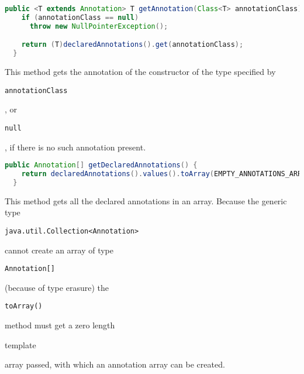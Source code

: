 \documentclass[a4paper, 10pt, titlepage]{scrartcl} %
\begin{document}
\begin{lstlisting}[language=Java,firstnumber=425]
  public <T extends Annotation> T getAnnotation(Class<T> annotationClass) {
    if (annotationClass == null)
      throw new NullPointerException();

    return (T)declaredAnnotations().get(annotationClass);
  }
\end{lstlisting}
This method gets the annotation of the constructor of the type specified by
\begin{scriptsize}\verb|annotationClass|\end{scriptsize}, or \begin{scriptsize}\verb|null|\end{scriptsize}, if there is no such annotation present.

\begin{lstlisting}[language=Java,firstnumber=435]
  public Annotation[] getDeclaredAnnotations() {
    return declaredAnnotations().values().toArray(EMPTY_ANNOTATIONS_ARRAY);
  }
\end{lstlisting}
This method gets all the declared annotations in an array. Because the generic
type \begin{scriptsize}\verb|java|\hspace{0.0pt}\verb|.|\hspace{0.0pt}\verb|util|\hspace{0.0pt}\verb|.|\hspace{0.0pt}\verb|Collection|\hspace{0.0pt}\verb|<|\hspace{0.0pt}\verb|Annotation|\hspace{0.0pt}\verb|>|\hspace{0.0pt}\verb||\end{scriptsize} cannot create an array of type
\begin{scriptsize}\verb|Annotation|\hspace{0.0pt}\verb|[|\hspace{0.0pt}\verb||\hspace{0.0pt}\verb|]|\hspace{0.0pt}\verb||\end{scriptsize} (because of type erasure) the \begin{scriptsize}\verb|toArray|\hspace{0.0pt}\verb|(|\hspace{0.0pt}\verb||\hspace{0.0pt}\verb|)|\hspace{0.0pt}\verb||\end{scriptsize} method must get a
zero length \begin{itshape}template\end{itshape} array passed, with which an annotation array can be
created.
\end{document}
